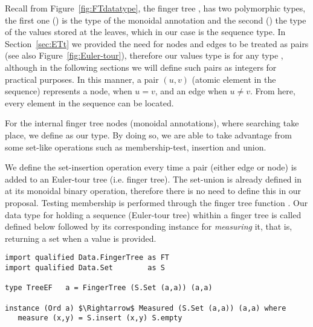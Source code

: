 Recall from Figure~\ref{fig:FTdatatype}, the finger tree , has two polymorphic types, the first one () is the type of the monoidal annotation and the second () the type of the values stored at the leaves, which in our case is the sequence type. In Section~\ref{sec:ETt} we provided the need for nodes and edges to be treated as pairs (see also Figure~\ref{fig:Euler-tour}), therefore our values type is  for any type , although in the following sections we will define such pairs as integers for practical purposes. In this manner, a pair $(u,v)$ (atomic element in the sequence) represents a node, when $u = v$, and an edge when $u \neq v$. From here, every element in the sequence can be located.

For the internal finger tree nodes (monoidal annotations), where searching take place, we define  as our type. By doing so, we are able to take advantage from some set-like operations such as membership-test, insertion and union. 

We define the set-insertion operation every time a pair (either edge or node) is added to an Euler-tour tree (i.e. finger tree). The set-union is already defined in  at its monoidal binary operation, therefore there is no need to define this in our proposal. Testing membership is performed through the finger tree  function \cite{FTsURL}. Our data type for holding a sequence (Euler-tour tree) whithin a finger tree is called  defined below followed by its corresponding instance for \textit{measuring} it, that is, returning a set when a value is provided.

\begin{lstlisting}[mathescape]
import qualified Data.FingerTree as FT
import qualified Data.Set        as S

type TreeEF   a = FingerTree (S.Set (a,a)) (a,a)

instance (Ord a) $\Rightarrow$ Measured (S.Set (a,a)) (a,a) where 
   measure (x,y) = S.insert (x,y) S.empty 
\end{lstlisting} 

